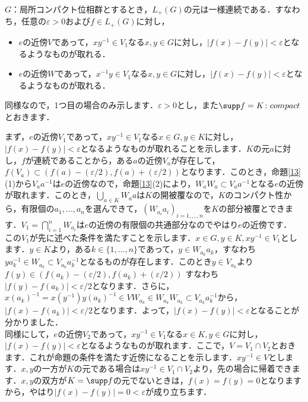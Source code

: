 \begin{prop}\label{16}
$G$：局所コンパクト位相群とするとき，$L_{+}(G)$の元は一様連続である．すなわち，任意の$\varepsilon>0$および$f \in L_{+}(G)$に対し，
\begin{itemize}
 \item $e$の近傍$V$であって，$xy^{-1} \in V_1$なる$x, y \in G$に対し，$|f(x)-f(y)|<\varepsilon$となるようなものが取れる．
 \item $e$の近傍$W$であって，$x^{-1}y \in V_1$なる$x, y \in G$に対し，$|f(x)-f(y)|<\varepsilon$となるようなものが取れる．
\end{itemize}
\end{prop}
\begin{Proof}
同様なので，1つ目の場合のみ示します．$\varepsilon>0$とし，また$\supp f=K \colon compact$とおきます．

まず，$e$の近傍$V_1$であって，$xy^{-1} \in V_1$なる$x \in G, y \in K$に対し，$|f(x)-f(y)|<\varepsilon$となるようなものが取れることを示します．$K$の元$a$に対し，$f$が連続であることから，ある$a$の近傍$V_a$が存在して，$f(V_a) \subset (f(a)-(\varepsilon /2), f(a)+(\varepsilon /2) )$となります．このとき，命題\ref{13}(1)から$V_{a}a^{-1}$は$e$の近傍なので，命題\ref{13}(2)により，$W_{a}W_{a} \subset V_{a}a^{-1}$となる$e$の近傍が取れます．このとき，$\bigcup_{a \in K}{W_a}a$は$K$の開被覆なので，$K$のコンパクト性から，有限個の$a_1, \ldots, a_n$を選んできて，$( W_{a_i}a_{i} )_{i=1,\ldots,n}$を$K$の部分被覆とできます．$V_1=\bigcap_{i=1}^{n}W_{a_i}$は$e$の近傍の有限個の共通部分なのでやはり$e$の近傍です．\\

この$V_1$が先に述べた条件を満たすことを示します．$x \in G, y \in K, xy^{-1} \in V_1$とします．$y \in K$より，ある$k \in \{1, \ldots , n \}$であって，$y \in W_{a_k}a_{k}$，すなわち$ya_{k}^{-1} \in W_{a_k} \subset V_{a_k}a_{k}^{-1}$となるものが存在します．このとき$y \in V_{a_k}$より$f(y) \in (f(a_k)-(\varepsilon/2), f(a_k)+(\varepsilon /2) )$ すなわち $|f(y)-f(a_k)|<\varepsilon /2$となります．さらに，$x(a_k)^{-1}=x(y^{-1})y(a_k)^{-1} \in VW_{a_k} \in W_{a_k}W_{a_k} \subset V_{a_k}a_{k}^{-1}$から，$|f(x)-f(a_k)|<\varepsilon /2$となります．よって，$|f(x)-f(y)|<\varepsilon$となることが分かりました．\\

同様にして，$e$の近傍$V_2$であって，$xy^{-1} \in V_1$なる$x \in K, y \in G$に対し，$|f(x)-f(y)|<\varepsilon$となるようなものが取れます．ここで，$V=V_1 \cap V_2$とおきます．これが命題の条件を満たす近傍になることを示します．$xy^{-1} \in V$とします．$x,y$の一方が$K$の元である場合は$xy^{-1} \in V_1 \cap V_2$より，先の場合に帰着できます．$x,y$の双方が$K=\supp f$の元でないときは，$f(x)=f(y)=0$となりますから，やはり$|f(x)-f(y)|=0<\varepsilon$が成り立ちます．　
\end{Proof}

